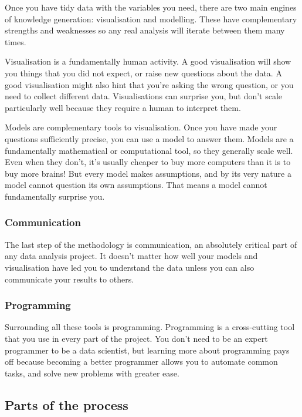 \documentclass[]{book}
\begin{document}
Once you have tidy data with the variables you need, there are two main
engines of knowledge generation: visualisation and modelling. These have
complementary strengths and weaknesses so any real analysis will iterate
between them many times.

Visualisation is a fundamentally human activity. A good visualisation
will show you things that you did not expect, or raise new questions
about the data. A good visualisation might also hint that you're asking
the wrong question, or you need to collect different data.
Visualisations can surprise you, but don't scale particularly well
because they require a human to interpret them.

Models are complementary tools to visualisation. Once you have made your
questions sufficiently precise, you can use a model to answer them.
Models are a fundamentally mathematical or computational tool, so they
generally scale well. Even when they don't, it's usually cheaper to buy
more computers than it is to buy more brains! But every model makes
assumptions, and by its very nature a model cannot question its own
assumptions. That means a model cannot fundamentally surprise you.

\subsubsection{Communication}\label{communication}

The last step of the methodology is communication, an absolutely
critical part of any data analysis project. It doesn't matter how well
your models and visualisation have led you to understand the data unless
you can also communicate your results to others.

\subsubsection{Programming}\label{programming}

Surrounding all these tools is programming. Programming is a
cross-cutting tool that you use in every part of the project. You don't
need to be an expert programmer to be a data scientist, but learning
more about programming pays off because becoming a better programmer
allows you to automate common tasks, and solve new problems with greater
ease.

\subsection{Parts of the process}\label{parts-of-the-process}
\end{document}

